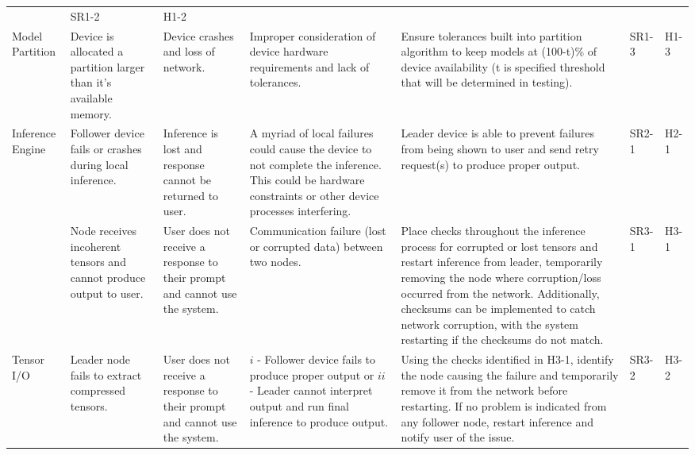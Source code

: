 \documentclass{article}
\begin{document}
\begin{landscape}
\begin{longtable}{|p{}|p{}|p{}|p{}|p{}|p{}|p{}|}
  & SR1-2
  & H1-2 \\ \cline{2-7}
\multirow{-3}{\dimexpr0.2\textwidth\relax}{Model Partition}
  & Device is allocated a partition larger than it's available memory.
  & Device crashes and loss of network.
  & Improper consideration of device hardware requirements and lack of tolerances.
  & Ensure tolerances built into partition algorithm to keep models at (100-t)\% of device availability (t is specified threshold 
  that will be determined in testing).
  & SR1-3
  & H1-3 \\ \hline
%
%
Inference Engine
  & Follower device fails or crashes during local inference.
  & Inference is lost and response cannot be returned to user.
  & A myriad of local failures could cause the device to not complete the inference. This could be hardware constraints or other device processes interfering.
  & Leader device is able to prevent failures from being shown to user and send retry request(s) to produce proper output.
  & SR2-1
  & H2-1 \\ \hline
%
%
  & Node receives incoherent tensors and cannot produce output to user.
  & User does not receive a response to their prompt and cannot use the system.
  & Communication failure (lost or corrupted data) between two nodes.
  & Place checks throughout the inference process for corrupted or lost tensors and restart inference from leader, temporarily removing the node where corruption/loss occurred from the network. Additionally, checksums 
  can be implemented to catch network corruption, with the system restarting if the checksums do not match.
  & SR3-1
  & H3-1 \\ \cline{2-7}
\multirow{-2}{\dimexpr0.2\textwidth\relax}{Tensor I/O}
  & Leader node fails to extract compressed tensors. 
  & User does not receive a response to their prompt and cannot use the system.
  & $i$ - Follower device fails to produce proper output or $ii$ - Leader cannot interpret output and run final inference to produce output.
  & Using the checks identified in H3-1, identify the node causing the failure and temporarily remove it from the network before restarting. If no problem is indicated from any follower node, restart
  inference and notify user of the issue.
  & SR3-2
  & H3-2 \\ \hline
%

\end{longtable}
\end{landscape}
\end{document}
